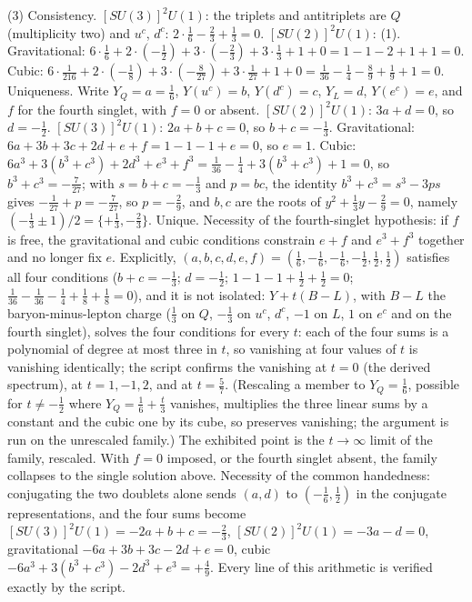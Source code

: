 (3) Consistency. $[SU(3)]^{2}U(1)$: the triplets and antitriplets are $Q$ (multiplicity two) and $u^{c}$, $d^{c}$: $2 \cdot \tfrac16 - \tfrac23 + \tfrac13 = 0$. $[SU(2)]^{2}U(1)$: (1). Gravitational: $6 \cdot \tfrac16 + 2 \cdot (-\tfrac12) + 3 \cdot (-\tfrac23) + 3 \cdot \tfrac13 + 1 + 0 = 1 - 1 - 2 + 1 + 1 = 0$. Cubic: $6 \cdot \tfrac{1}{216} + 2 \cdot (-\tfrac18) + 3 \cdot (-\tfrac{8}{27}) + 3 \cdot \tfrac{1}{27} + 1 + 0 = \tfrac{1}{36} - \tfrac14 - \tfrac89 + \tfrac19 + 1 = 0$. Uniqueness. Write $Y_{Q} = a = \tfrac16$, $Y(u^{c}) = b$, $Y(d^{c}) = c$, $Y_{L} = d$, $Y(e^{c}) = e$, and $f$ for the fourth singlet, with $f = 0$ or absent. $[SU(2)]^{2}U(1)$: $3a + d = 0$, so $d = -\tfrac12$. $[SU(3)]^{2}U(1)$: $2a + b + c = 0$, so $b + c = -\tfrac13$. Gravitational: $6a + 3b + 3c + 2d + e + f = 1 - 1 - 1 + e = 0$, so $e = 1$. Cubic: $6a^{3} + 3(b^{3} + c^{3}) + 2d^{3} + e^{3} + f^{3} = \tfrac{1}{36} - \tfrac14 + 3(b^{3} + c^{3}) + 1 = 0$, so $b^{3} + c^{3} = -\tfrac{7}{27}$; with $s = b + c = -\tfrac13$ and $p = bc$, the identity $b^{3} + c^{3} = s^{3} - 3ps$ gives $-\tfrac{1}{27} + p = -\tfrac{7}{27}$, so $p = -\tfrac29$, and $b, c$ are the roots of $y^{2} + \tfrac13 y - \tfrac29 = 0$, namely $(-\tfrac13 \pm 1)/2 = \{+\tfrac13, -\tfrac23\}$. Unique. Necessity of the fourth-singlet hypothesis: if $f$ is free, the gravitational and cubic conditions constrain $e + f$ and $e^{3} + f^{3}$ together and no longer fix $e$. Explicitly, $(a, b, c, d, e, f) = (\tfrac16, -\tfrac16, -\tfrac16, -\tfrac12, \tfrac12, \tfrac12)$ satisfies all four conditions ($b + c = -\tfrac13$; $d = -\tfrac12$; $1 - 1 - 1 + \tfrac12 + \tfrac12 = 0$; $\tfrac{1}{36} - \tfrac{1}{36} - \tfrac14 + \tfrac18 + \tfrac18 = 0$), and it is not isolated: $Y + t(B - L)$, with $B - L$ the baryon-minus-lepton charge ($\tfrac13$ on $Q$, $-\tfrac13$ on $u^{c}$, $d^{c}$, $-1$ on $L$, $1$ on $e^{c}$ and on the fourth singlet), solves the four conditions for every $t$: each of the four sums is a polynomial of degree at most three in $t$, so vanishing at four values of $t$ is vanishing identically; the script confirms the vanishing at $t = 0$ (the derived spectrum), at $t = 1, -1, 2$, and at $t = \tfrac57$. (Rescaling a member to $Y_{Q} = \tfrac16$, possible for $t \neq -\tfrac12$ where $Y_{Q} = \tfrac16 + \tfrac{t}{3}$ vanishes, multiplies the three linear sums by a constant and the cubic one by its cube, so preserves vanishing; the argument is run on the unrescaled family.) The exhibited point is the $t \to \infty$ limit of the family, rescaled. With $f = 0$ imposed, or the fourth singlet absent, the family collapses to the single solution above. Necessity of the common handedness: conjugating the two doublets alone sends $(a, d)$ to $(-\tfrac16, \tfrac12)$ in the conjugate representations, and the four sums become $[SU(3)]^{2}U(1) = -2a + b + c = -\tfrac23$, $[SU(2)]^{2}U(1) = -3a - d = 0$, gravitational $-6a + 3b + 3c - 2d + e = 0$, cubic $-6a^{3} + 3(b^{3} + c^{3}) - 2d^{3} + e^{3} = +\tfrac49$. Every line of this arithmetic is verified exactly by the script.
